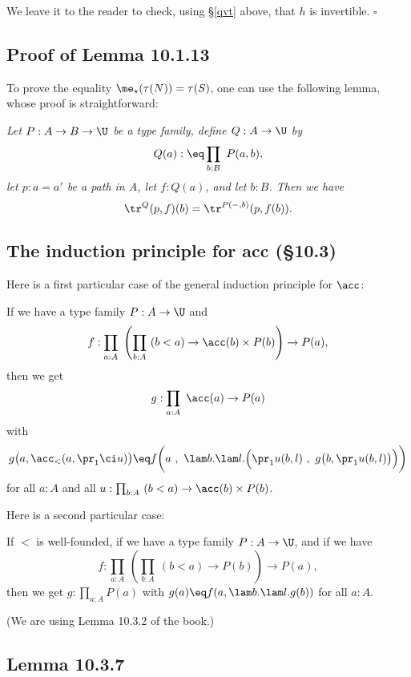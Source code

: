 \documentclass[12pt]{article}
\begin{document}
We leave it to the reader to check, using \S\ref{qvt} above, that $h$ is invertible. $\square$


\subsection{Proof of Lemma 10.1.13}

To prove the equality $\me_\star(\tau(N))=\tau(S)$, one can use the following lemma, whose proof is straightforward:

\nn{} \emph{Let $P:A\to B\to\U$ be a type family, define $Q:A\to\U$ by 
$$
Q(a):\eq\prod_{b:B}\ P(a,b),
$$ 
let $p:a=a'$ be a path in $A$, let $f:Q(a)$, and let $b:B$. Then we have} 
$$
\tr^Q(p,f)(b)=\tr^{P(-,b)}(p,f(b)).
$$


\subsection{The induction principle for \textsf{acc} (\S10.3)}

Here is a first particular case of the general induction principle for $\acc$:

If we have a type family $P:A\to\U$ and %
$$
f:\prod_{a:A}\ \left(\prod_{b:A}\ (b<a)\to\acc(b)\times P(b)\right)\to P(a),%
$$ 
then we get 
$$
g:\prod_{a:A}\ \acc(a)\to P(a)
$$
with
$$
g\big(a,\acc_<(a,\pr_1\ci u)\big)\eq f\bigg(a\ ,\ \lam b.\lam l.\Big(\pr_1 u(b,l)\ ,\ g\big(b,\pr_1 u(b,l)\big)\Big)\bigg)
$$
for all $a:A$ and all $u:\prod_{b:A}\ (b<a)\to\acc(b)\times P(b)$. 

Here is a second particular case:

If $<$ is well-founded, if we have a type family $P:A\to\U$, and if we have 
\begin{equation}\label{103}
f:\prod_{a:A}\ \left(\prod_{b:A}\ (b<a)\to P(b)\right)\to P(a),
\end{equation} 
then we get $g:\prod_{a:A}P(a)$ with $g(a)\eq f(a,\lam b.\lam l.g(b))$ for all $a:A$.

(We are using Lemma 10.3.2 of the book.)


\subsection{Lemma 10.3.7}%
\end{document}
